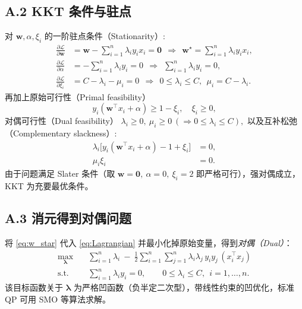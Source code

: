 \documentclass[10.5pt,hyperref,a4paper,UTF8]{ctexart}
\theoremstyle{definition}
\begin{document}
\subsection*{A.2 KKT 条件与驻点}
对 $\bm w,\alpha,\xi_i$ 的一阶驻点条件（Stationarity）:
\begin{align}
\frac{\partial \mathcal{L}}{\partial \bm w} &= \bm w - \sum_{i=1}^n \lambda_i y_i x_i = \bm 0
\ \ \Rightarrow\ \ \bm w^\star = \sum_{i=1}^n \lambda_i y_i x_i, \label{eq:w_star}\\
\frac{\partial \mathcal{L}}{\partial \alpha} &= -\sum_{i=1}^n \lambda_i y_i = 0
\ \ \Rightarrow\ \ \sum_{i=1}^n \lambda_i y_i = 0,\label{eq:alpha_cond}\\
\frac{\partial \mathcal{L}}{\partial \xi_i} &= C - \lambda_i - \mu_i = 0
\ \ \Rightarrow\ \ 0 \le \lambda_i \le C,\ \ \mu_i = C-\lambda_i.\label{eq:xi_cond}
\end{align}
再加上原始可行性（Primal feasibility）
\[
y_i(\bm w^\top x_i+\alpha)\ge 1-\xi_i,\quad \xi_i\ge 0,
\]
对偶可行性（Dual feasibility）
\(
\lambda_i\ge0,\ \mu_i\ge0\ (\Rightarrow 0\le\lambda_i\le C),
\)
以及互补松弛（Complementary slackness）:
\begin{align}
\lambda_i\bigl[y_i(\bm w^\top x_i+\alpha)-1+\xi_i\bigr] &= 0,\label{eq:cs1}\\
\mu_i \xi_i &= 0. \label{eq:cs2}
\end{align}
由于问题满足 Slater 条件（取 $\bm w=\bm 0,\ \alpha=0,\ \xi_i=2$ 即严格可行），强对偶成立，KKT 为充要最优条件。

\subsection*{A.3 消元得到对偶问题}
将 \eqref{eq:w_star} 代入 \eqref{eq:Lagrangian} 并最小化掉原始变量，得到\emph{对偶（Dual）}：
\begin{equation}\label{eq:dual}
\begin{aligned}
\max_{\bm\lambda}\quad & 
\sum_{i=1}^n \lambda_i \ -\ \frac{1}{2}\sum_{i=1}^n\sum_{j=1}^n 
\lambda_i \lambda_j\, y_i y_j\, (x_i^\top x_j)\\
\text{s.t.}\quad &
\sum_{i=1}^n \lambda_i y_i = 0,\qquad 0\le \lambda_i \le C,\ \ i=1,\dots,n.
\end{aligned}
\end{equation}
该目标函数关于 $\bm\lambda$ 为严格凹函数（负半定二次型），带线性约束的凹优化，标准 QP 可用 SMO 等算法求解。
\end{document}
